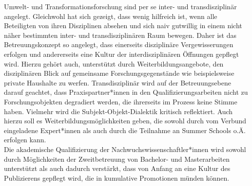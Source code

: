 \documentclass[a4paper,11pt,twoside]{scrartcl}
\begin{document}
Umwelt- und Transformationsforschung sind per se inter- und transdisziplinär angelegt. Gleichwohl hat sich gezeigt, dass wenig hilfreich ist, wenn alle Beteiligten von ihren Disziplinen absehen und sich naiv gutwillig in einem nicht näher bestimmten inter- und transdisziplinären Raum bewegen. Daher ist das Betreuungskonzept so angelegt, dass einerseits disziplinäre Vergewisserungen erfolgen und andererseits eine Kultur der interdisziplinären Öffnungen gepflegt wird. Hierzu gehört auch, unterstützt durch Weiterbildungsangebote, den disziplinären Blick auf gemeinsame Forschungsgegenstände wie beispielsweise private Haushalte zu werfen. Transdisziplinär wird auf der Betreuungsebene darauf geachtet, dass Praxispartner*innen in den Qualifizierungsarbeiten nicht zu Forschungsobjekten degradiert werden, die ihrerseits im Prozess keine Stimme haben. Vielmehr wird die Subjekt-Objekt-Dialektik kritisch reflektiert. Auch hierzu soll es Weiterbildungsmöglichkeiten geben, die sowohl durch vom Verbund eingeladene Expert*innen als auch durch die Teilnahme an Summer Schools o.Ä. erfolgen kann.\\ 
Die akademische Qualifizierung der Nachwuchswissenschaftler*innen wird sowohl durch Möglichkeiten der Zweitbetreuung von Bachelor- und Masterarbeiten unterstützt als auch dadurch verstärkt, dass von Anfang an eine Kultur des Publizierens gepflegt wird, die in kumulative Promotionen münden können.
\end{document}
